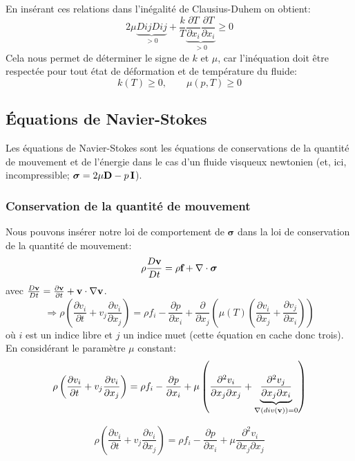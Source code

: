 En insérant ces relations dans l'inégalité de Clausius-Duhem on obtient:
$$2\mu\underbrace{DijDij}_{>0}+\frac{k}{T}\underbrace{\frac{\partial T}{\partial x_i}\frac{\partial T}{\partial x_i}}_{>0}\geq 0$$
Cela nous permet de déterminer le signe de $k$ et $\mu$, car l'inéquation doit être respectée pour tout état de déformation et de température du fluide:
$$\boxed{k(T)\geq 0, \qquad \mu(p,T)\geq 0}$$

\subsection{\'Equations de Navier-Stokes}
Les équations de Navier-Stokes sont les équations de conservations de la quantité de mouvement et de l'énergie dans le cas d'un fluide visqueux newtonien (et, ici, incompressible; $\boldsymbol{\sigma}=2\mu\textbf{D}-p\,\textbf{I}$).
\subsubsection*{Conservation de la quantité de mouvement}
Nous pouvons insérer notre loi de comportement de $\boldsymbol{\sigma}$ dans la loi de conservation de la quantité de mouvement:
$$\rho\frac{D\textbf{v}}{Dt}=\rho\textbf{f}+\nabla\cdot\boldsymbol{\sigma}$$
avec $\frac{D\textbf{v}}{Dt}=\frac{\partial\textbf{v}}{\partial t}+\textbf{v}\cdot\nabla\textbf{v}$.
$$\Rightarrow\rho\left(\frac{\partial v_i}{\partial t}+v_j\frac{\partial v_i}{\partial x_j}\right)=\rho f_i-\frac{\partial p}{\partial x_i}+\frac{\partial}{\partial x_j}\left(\mu(T)\left(\frac{\partial v_i}{\partial x_j}+\frac{\partial v_j}{\partial x_i}\right)\right) $$ où $i$ est un indice libre et $j$ un indice muet (cette équation en cache donc trois). En considérant le paramètre $\mu$ constant:
$$\rho\left(\frac{\partial v_i}{\partial t}+v_j\frac{\partial v_i}{\partial x_j}\right)=\rho f_i-\frac{\partial p}{\partial x_i}+\mu\left(\frac{\partial^2v_i}{\partial x_j\partial x_j}+\underbrace{\frac{\partial^2 v_j}{\partial x_j\partial x_i}}_{\nabla(div(\textbf{v}))=0}\right) $$

$$\boxed{\rho\left(\frac{\partial v_i}{\partial t}+v_j\frac{\partial v_i}{\partial x_j}\right)=\rho f_i-\frac{\partial p}{\partial x_i}+\mu\frac{\partial^2v_i}{\partial x_j\partial x_j}} $$

